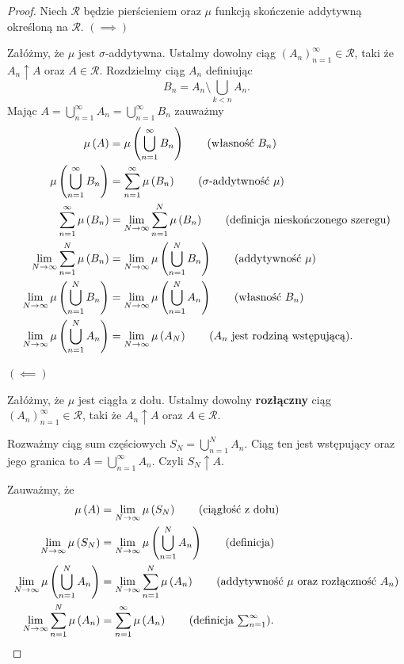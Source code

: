 \begin{proof}
Niech $\mathcal{R}$ będzie pierścieniem oraz $\mu$ funkcją skończenie addytywną określoną na $\mathcal{R}$. 
$(\bm{ \implies } )$

Załóżmy, że $\mu$ jest $\sigma$-addytywna. Ustalmy dowolny ciąg $\left( A_{n} \right)_{n=1}^{\infty} \in \mathcal{R}$, taki że $A_{n}\uparrow A$ oraz $A\in \mathcal{R}$. Rozdzielmy ciąg $A_n$ definiując \[
B_{n} = A_{n}\setminus \bigcup_{k<n} A_{n}
.\] 
Mając $A = \bigcup_{n=1} ^{\infty}A_{n} = \bigcup_{n=1}^{\infty}B_{n}$ zauważmy
\begin{align*}
	\mu\left( A \right) &= \mu\left( \bigcup_{n=1} ^{\infty} B_{n}\right)\tag{własność $B_{n}$} \\
	\mu\left( \bigcup_{n=1} ^{\infty} B_{n}\right)  &= \sum_{n = 1}^{\infty} \mu\left( B_{n} \right) \tag{$\sigma$-addytwność $\mu$} \\
	\sum_{n = 1}^{\infty} \mu\left( B_{n} \right) &= \lim_{N \to \infty} \sum_{n = 1}^{N} \mu\left( B_{n} \right)\tag{definicja nieskończonego szeregu} \\
	      \lim_{N \to \infty} \sum_{n = 1}^{N} \mu\left( B_{n} \right) &= \lim_{N \to \infty}  \mu\left( \bigcup_{n=1}^{N}B_{n} \right) \tag{addytywność $\mu$}\\
	      \lim_{N \to \infty}  \mu\left( \bigcup_{n=1}^{N}B_{n} \right)  &= \lim_{N \to \infty} \mu\left( \bigcup_{n=1} ^{N}A_{n} \right)\tag{własność $B_{n}$} \\
	       \lim_{N \to \infty} \mu\left( \bigcup_{n=1} ^{N}A_{n} \right)&= \lim_{N \to \infty} \mu\left( A_{N} \right) \tag{$A_{n}$ jest rodziną wstępującą}
.\end{align*}	

$\bm{ (\impliedby) } $

Załóżmy, że $\mu$ jest ciągła z dołu. Ustalmy dowolny \textbf{rozłączny} ciąg $\left( A_{n} \right)_{n=1}^{\infty} \in \mathcal{R}$, taki że $A_{n}\uparrow A$ oraz $A\in \mathcal{R}$. 

Rozważmy ciąg sum częściowych $S_{N} = \bigcup_{n=1} ^{N}A_{n}$. Ciąg ten jest wstępujący oraz jego granica to $A = \bigcup_{n=1} ^{\infty}A_{n}$. Czyli $S_{N}\uparrow A$.

Zauważmy, że
\begin{align*}
	\mu\left( A \right) &= \lim_{N \to \infty} \mu\left( S_{N} \right) \tag{ciągłość z dołu} \\
	\lim_{N \to \infty} \mu\left( S_{N} \right) &= \lim_{N \to \infty} \mu\left( \bigcup_{n=1} ^{N}A_{n} \right) \tag{definicja} \\  
	\lim_{N \to \infty} \mu\left( \bigcup_{n=1} ^{N}A_{n} \right) &= \lim_{N \to \infty} \sum_{n=1}^{N} \mu\left( A_{n} \right) \tag{addytywność $\mu$ oraz rozłączność $A_{n}$} \\
	\lim_{N \to \infty} \sum_{n=1}^{N} \mu\left( A_{n} \right) &= \sum_{n=1}^{\infty} \mu\left( A_{n} \right) \tag{definicja $\sum_{n = 1}^{\infty}$} 
.\end{align*}
\end{proof} 
